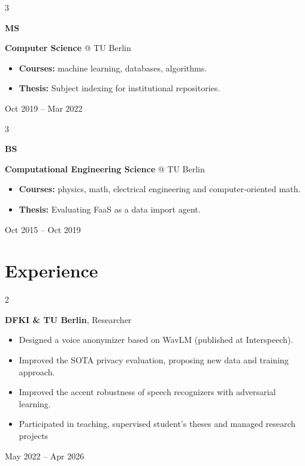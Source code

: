 \documentclass[10pt, letterpaper]{article}
\newenvironment{highlights}{
    \begin{itemize}[
        topsep=0.10 cm,
        parsep=0.10 cm,
        partopsep=0pt,
        itemsep=0pt,
        leftmargin=0.4 cm + 10pt
    ]
}{
    \end{itemize}
} %
\newenvironment{twocolentry}[2][]{
    \onecolentry
    \def\secondColumn{#2}
    \setcolumnwidth{\fill, 4.5 cm}
    \begin{paracol}{2}
}{
    \switchcolumn \raggedleft \secondColumn
    \end{paracol}
    \endonecolentry
} %
\newenvironment{threecolentry}[3][]{
    \onecolentry
    \def\thirdColumn{#3}
    \setcolumnwidth{1 cm, \fill, 4.5 cm}
    \begin{paracol}{3}
    {\raggedright #2} \switchcolumn
}{
    \switchcolumn \raggedleft \thirdColumn
    \end{paracol}
    \endonecolentry
} %
\begin{document}
        \begin{threecolentry}{\textbf{MS}}{Oct 2019 – Mar 2022}
            \textbf{Computer Science} @ TU Berlin
            \begin{highlights}
                \item \textbf{Courses:} machine learning, databases, algorithms.
                \item \textbf{Thesis:} Subject indexing for institutional repositories.
            \end{highlights}
        \end{threecolentry}

        \begin{threecolentry}{\textbf{BS}}{Oct 2015 – Oct 2019}
            \textbf{Computational Engineering Science} @ TU Berlin
            \begin{highlights}
                \item \textbf{Courses:} physics, math, electrical engineering and computer-oriented math.
                \item \textbf{Thesis:} Evaluating FaaS as a data import agent.
            \end{highlights}
        \end{threecolentry}
    
    \section{Experience}
   
        \begin{twocolentry}{May 2022 – Apr 2026}
            \textbf{DFKI \& TU Berlin}, Researcher
            \begin{highlights}
                \item Designed a voice anonymizer based on WavLM (published at Interspeech).
                \item Improved the SOTA privacy evaluation, proposing new data and training approach.
                \item Improved the accent robustness of speech recognizers with adversarial learning.
                \item Participated in teaching, supervised student's theses and managed research projects
            \end{highlights}
        \end{twocolentry}

        \vspace{0.1 cm}
\end{document}
